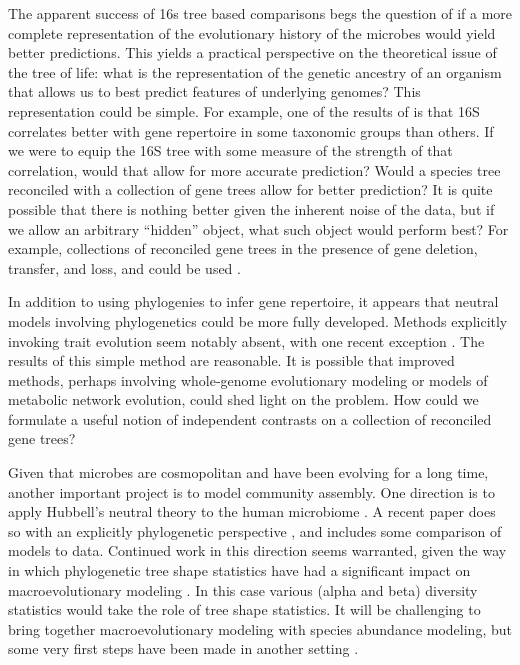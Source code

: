 \documentclass{amsart}
\begin{document}
The apparent success of 16s tree based comparisons begs the question of if a more complete representation of the evolutionary history of the microbes would yield better predictions.
This yields a practical perspective on the theoretical issue of the tree of life: what is the representation of the genetic ancestry of an organism that allows us to best predict features of underlying genomes?
This representation could be simple.
For example, one of the results of \citet{zaneveld2010ribosomal} is that 16S correlates better with gene repertoire in some taxonomic groups than others.
If we were to equip the 16S tree with some measure of the strength of that correlation, would that allow for more accurate prediction?
Would a species tree reconciled with a collection of gene trees allow for better prediction?
It is quite possible that there is nothing better given the inherent noise of the data, but if we allow an arbitrary ``hidden'' object, what such object would perform best?
For example, collections of reconciled gene trees in the presence of gene deletion, transfer, and loss, and could be used \citep[see][for interesting recent results]{szollHosi2013lateral,szollHosi2013efficient}.

In addition to using phylogenies to infer gene repertoire, it appears that neutral models involving phylogenetics could be more fully developed.
Methods explicitly invoking trait evolution seem notably absent, with one recent exception \cite{langille2013predictive}.
The results of this simple method are reasonable.
It is possible that improved methods, perhaps involving whole-genome evolutionary modeling or models of metabolic network evolution, could shed light on the problem.
How could we formulate a useful notion of independent contrasts \citep{felsenstein1985phylogenies} on a collection of reconciled gene trees?

Given that microbes are cosmopolitan and have been evolving for a long time, another important project is to model community assembly.
One direction is to apply Hubbell's neutral theory to the human microbiome \citep{fierer2012animalcules,costello2012application}.
A recent paper does so with an explicitly phylogenetic perspective \citep{o2012phylogenetic}, and includes some comparison of models to data.
Continued work in this direction seems warranted, given the way in which phylogenetic tree shape statistics have had a significant impact on macroevolutionary modeling \cite{mooers1997inferring,aldous2011five}.
In this case various (alpha and beta) diversity statistics would take the role of tree shape statistics.
It will be challenging to bring together macroevolutionary modeling with species abundance modeling, but some very first steps have been made in another setting \citep{lambert2013predicting}.
\end{document}
